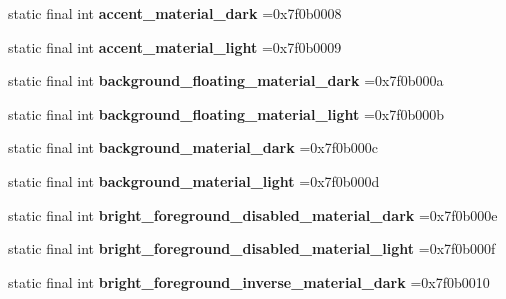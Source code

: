 \begin{DoxyCompactItemize}
static final int {\bfseries accent\+\_\+material\+\_\+dark} =0x7f0b0008
\item 
\mbox{\label{classproject4_1_1xaria_1_1R_1_1color_aa00be49369742963047a58518c2425a2}} 
static final int {\bfseries accent\+\_\+material\+\_\+light} =0x7f0b0009
\item 
\mbox{\label{classproject4_1_1xaria_1_1R_1_1color_afb6ff8a99b6f4ada7e98d4f4f9292400}} 
static final int {\bfseries background\+\_\+floating\+\_\+material\+\_\+dark} =0x7f0b000a
\item 
\mbox{\label{classproject4_1_1xaria_1_1R_1_1color_ac446fb7ddb4db66706ec8d7e7d4906e0}} 
static final int {\bfseries background\+\_\+floating\+\_\+material\+\_\+light} =0x7f0b000b
\item 
\mbox{\label{classproject4_1_1xaria_1_1R_1_1color_a428a7f7a07ca3dda64c2cbea82cc3b3f}} 
static final int {\bfseries background\+\_\+material\+\_\+dark} =0x7f0b000c
\item 
\mbox{\label{classproject4_1_1xaria_1_1R_1_1color_a718dd95e1d0eafc5c88320874c9a67cd}} 
static final int {\bfseries background\+\_\+material\+\_\+light} =0x7f0b000d
\item 
\mbox{\label{classproject4_1_1xaria_1_1R_1_1color_a1c3af1a6f833d78a15e7d8b837fff76c}} 
static final int {\bfseries bright\+\_\+foreground\+\_\+disabled\+\_\+material\+\_\+dark} =0x7f0b000e
\item 
\mbox{\label{classproject4_1_1xaria_1_1R_1_1color_a6b7c2f48caceab591937d3440cf1950f}} 
static final int {\bfseries bright\+\_\+foreground\+\_\+disabled\+\_\+material\+\_\+light} =0x7f0b000f
\item 
\mbox{\label{classproject4_1_1xaria_1_1R_1_1color_aa40a81473bfb724db0978dcfc5d5a59d}} 
static final int {\bfseries bright\+\_\+foreground\+\_\+inverse\+\_\+material\+\_\+dark} =0x7f0b0010
\item 
\mbox{\label{classproject4_1_1xaria_1_1R_1_1color_a9d1a1424fa8432af06ff8265d9268782}} 

\end{DoxyCompactItemize}
